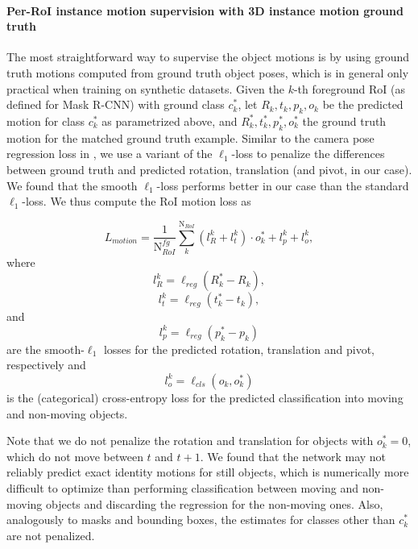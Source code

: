 \paragraph{Per-RoI instance motion supervision with 3D instance motion ground truth}
The most straightforward way to supervise the object motions is by using ground truth
motions computed from ground truth object poses, which is in general
only practical when training on synthetic datasets.
Given the $k$-th foreground RoI (as defined for Mask R-CNN) with ground class $c_k^*$,
let $R_k, t_k, p_k, o_k$ be the predicted motion for class $c_k^*$ as parametrized above,
and $R_k^*, t_k^*, p_k^*, o_k^*$ the ground truth motion for the matched ground truth example.
Similar to the camera pose regression loss in \cite{PoseNet2},
we use a variant of the $\ell_1$-loss to penalize the differences between ground truth and predicted
rotation, translation (and pivot, in our case). We found that the smooth $\ell_1$-loss
performs better in our case than the standard $\ell_1$-loss.
We thus compute the RoI motion loss as

\begin{equation}
L_{motion} = \frac{1}{\text{N}_{RoI}^{\mathit{fg}}} \sum_k^{\text{N}_{RoI}} (l_{R}^k + l_{t}^k) \cdot o_k^* + l_{p}^k + l_o^k,
\end{equation}
where
\begin{equation}
l_{R}^k = \ell_{reg} (R_k^* - R_k),
\end{equation}
\begin{equation}
l_{t}^k = \ell_{reg} (t_k^* - t_k),
\end{equation}
and
\begin{equation}
l_{p}^k = \ell_{reg} (p_k^* - p_k)
\end{equation}
are the smooth-$\ell_1$ losses for the predicted rotation, translation and pivot,
respectively and
\begin{equation}
l_o^k = \ell_{cls}(o_k, o_k^*)
\end{equation}
is the (categorical) cross-entropy loss for the predicted classification into moving and non-moving objects.

Note that we do not penalize the rotation and translation for objects with
$o_k^* = 0$, which do not move between $t$ and $t+1$. We found that the network
may not reliably predict exact identity motions for still objects, which is
numerically more difficult to optimize than performing classification between
moving and non-moving objects and discarding the regression for the non-moving
ones. Also, analogously to masks and bounding boxes, the estimates for classes
other than $c_k^*$ are not penalized.

